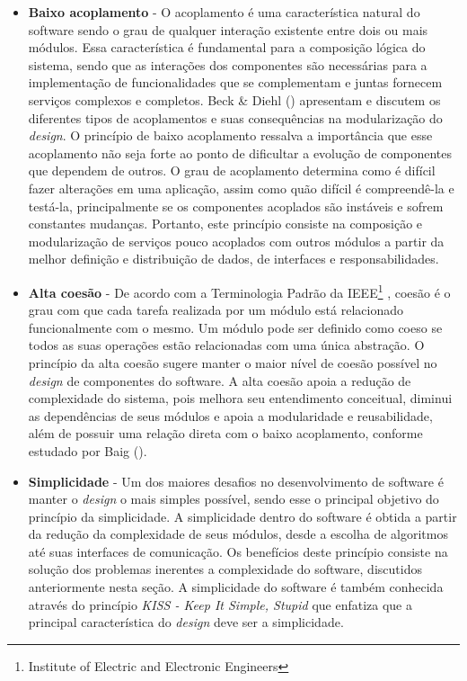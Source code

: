 \begin{itemize}
\item \textbf{Baixo acoplamento} - O acoplamento é uma característica natural do software sendo o grau de qualquer interação existente entre dois ou mais módulos.
%
Essa característica é fundamental para a composição lógica do sistema, sendo que as interações dos componentes são necessárias para a implementação de funcionalidades que se complementam e juntas fornecem serviços complexos e completos.
%
Beck \& Diehl (\citeyear{diehl2011}) apresentam e discutem os diferentes tipos de acoplamentos e suas consequências na modularização do \emph{design}.
%
O princípio de baixo acoplamento ressalva a importância que esse acoplamento não seja forte ao ponto de dificultar a evolução de componentes que dependem de outros.
%
O grau de acoplamento determina como é difícil fazer alterações em uma aplicação, assim como quão difícil é compreendê-la e testá-la, principalmente se os componentes acoplados são instáveis e sofrem constantes mudanças.
%
Portanto, este princípio consiste na composição e modularização de serviços pouco acoplados com outros módulos a partir da melhor definição e distribuição de dados, de interfaces e responsabilidades.

\item \textbf{Alta coesão} - De acordo com a Terminologia Padrão da IEEE\footnote{Institute of Electric and Electronic Engineers} \cite{ieee1990}, coesão é o grau com que cada tarefa realizada por um módulo está relacionado funcionalmente com o mesmo.
%
Um módulo pode ser definido como coeso se todos as suas operações estão relacionadas com uma única abstração.
%
O princípio da alta coesão sugere manter o maior nível de coesão possível no \emph{design} de componentes do software.
%
A alta coesão apoia a redução de complexidade do sistema, pois melhora seu entendimento conceitual, diminui as dependências de seus módulos e apoia a modularidade e reusabilidade, além de possuir uma relação direta com o baixo acoplamento, conforme estudado por Baig (\citeyear{baig2004}).

\item \textbf{Simplicidade} - Um dos maiores desafios no desenvolvimento de software é manter o \emph{design} o mais simples possível, sendo esse o principal objetivo do princípio da simplicidade.
%
A simplicidade dentro do software é obtida a partir da redução da complexidade de seus módulos, desde a escolha de algoritmos até suas interfaces de comunicação.
%
Os benefícios deste princípio consiste na solução dos problemas inerentes a complexidade do software, discutidos anteriormente nesta seção.
%
A simplicidade do software é também conhecida através do princípio \emph{KISS - Keep It Simple, Stupid} que enfatiza que a principal característica do \emph{design} deve ser a simplicidade.

\end{itemize}

